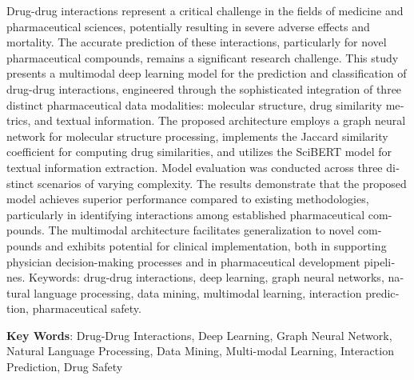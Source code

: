 \begin{latin}
\begin{small}
Drug-drug interactions represent a critical challenge in the fields of medicine and pharmaceutical sciences, potentially resulting in severe adverse effects and mortality. The accurate prediction of these interactions, particularly for novel pharmaceutical compounds, remains a significant research challenge. This study presents a multimodal deep learning model for the prediction and classification of drug-drug interactions, engineered through the sophisticated integration of three distinct pharmaceutical data modalities: molecular structure, drug similarity metrics, and textual information. The proposed architecture employs a graph neural network for molecular structure processing, implements the Jaccard similarity coefficient for computing drug similarities, and utilizes the SciBERT model for textual information extraction. Model evaluation was conducted across three distinct scenarios of varying complexity. The results demonstrate that the proposed model achieves superior performance compared to existing methodologies, particularly in identifying interactions among established pharmaceutical compounds. The multimodal architecture facilitates generalization to novel compounds and exhibits potential for clinical implementation, both in supporting physician decision-making processes and in pharmaceutical development pipelines. Keywords: drug-drug interactions, deep learning, graph neural networks, natural language processing, data mining, multimodal learning, interaction prediction, pharmaceutical safety.  



\end{small}

\vspace{0.5 cm}

\noindent \textbf{Key Words}: Drug-Drug Interactions, Deep Learning, Graph Neural Network, Natural Language Processing, Data Mining, Multi-modal Learning, Interaction Prediction, Drug Safety
\end{latin}